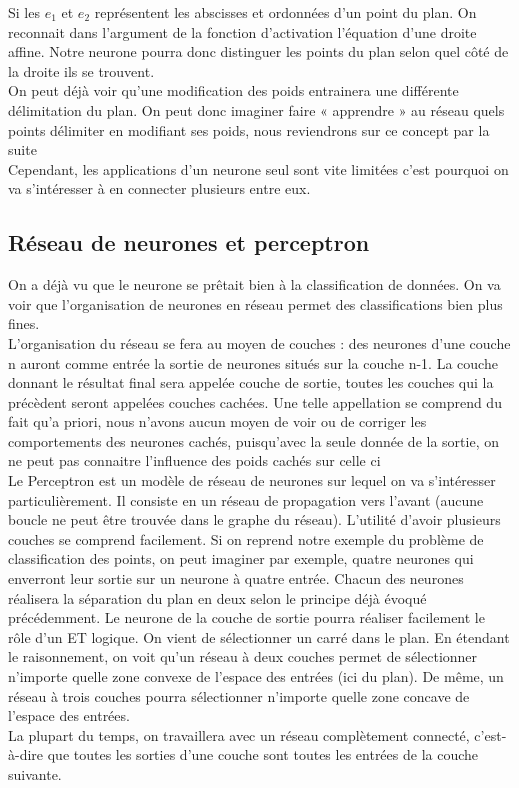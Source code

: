 Si les $e_1$ et $e_2$ représentent les abscisses et ordonnées d’un point du plan. On reconnait dans l’argument de la fonction d’activation l’équation d’une droite affine. Notre neurone pourra donc distinguer les points du plan selon quel côté de la droite ils se trouvent.\\

On peut déjà voir qu’une modification des poids entrainera une différente délimitation du plan. On peut donc imaginer faire « apprendre » au réseau quels points délimiter en modifiant ses poids, nous reviendrons sur ce concept par la suite\\
Cependant, les applications d’un neurone seul sont vite limitées c’est pourquoi on va s’intéresser à en connecter plusieurs entre eux.\\

\subsection{Réseau de neurones et perceptron} %
\label{sub:reseau_de_neurones}
On a déjà vu que le neurone se prêtait bien à la classification de données. On va voir que l’organisation de neurones en réseau permet des classifications bien plus fines.\\
L’organisation du réseau se fera au moyen de couches : des neurones d’une couche n auront comme entrée la sortie de neurones situés sur la couche n-1. La couche donnant le résultat final sera appelée couche de sortie, toutes les couches qui la précèdent seront appelées couches cachées. Une telle appellation se comprend du fait qu’a priori, nous n’avons aucun moyen de voir ou de corriger les comportements des neurones cachés, puisqu’avec la seule donnée de la sortie, on ne peut pas connaitre l’influence des poids cachés sur celle ci\\

Le Perceptron est un modèle de réseau de neurones sur lequel on va s’intéresser particulièrement. Il consiste en un réseau de propagation vers l’avant (aucune boucle ne peut être trouvée dans le graphe du réseau).
L’utilité d’avoir plusieurs couches se comprend facilement. Si on reprend notre exemple du problème de classification des points, on peut imaginer par exemple, quatre neurones qui enverront leur sortie sur un neurone à quatre entrée. Chacun des neurones réalisera la séparation du plan en deux selon le principe déjà évoqué précédemment. Le neurone de la couche de sortie pourra réaliser facilement le rôle d’un ET logique. On vient de sélectionner un carré dans le plan. En étendant le raisonnement, on voit qu’un réseau à deux couches permet de sélectionner n’importe quelle zone convexe de l’espace des entrées (ici du plan). De même, un réseau à trois couches pourra sélectionner n’importe quelle zone concave de l’espace des entrées.\\
La plupart du temps, on travaillera avec un réseau complètement connecté, c’est-à-dire que toutes les sorties d’une couche sont toutes les entrées de la couche suivante.

